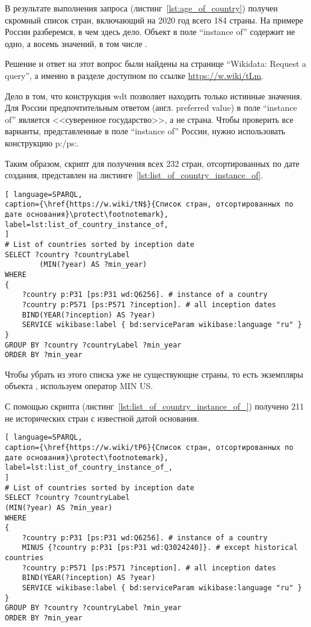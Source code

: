 В результате выполнения запроса (листинг~\ref{lst:age_of_country}) получен скромный список стран, включающий на 2020 год всего 184 страны. На примере России разберемся, в чем здесь дело. Объект  в поле ``instance of'' содержит не одно, а восемь значений, в том числе .


Решение и ответ на этот вопрос были найдены на странице ``Wikidata: Request a query'', а именно в разделе доступном по ссылке \href{https://w.wiki/tLm}{https://w.wiki/tLm}.

Дело в том, что конструкция wdt позволяет находить только истинные значения. Для России предпочтительным ответом (англ. preferred value) в поле ``instance of'' является <<суверенное государство>>, а не страна. Чтобы проверить все варианты, представленные в поле ``instance of'' России, нужно использовать конструкцию p:/ps:.

Таким образом, скрипт для получения всех 232 стран, отсортированных по дате создания, представлен на листинге~\ref{lst:list_of_country_instance_of}.

\begin{lstlisting}[ language=SPARQL, 
caption={\href{https://w.wiki/tN$}{Список стран, отсортированных по дате основания}\protect\footnotemark},
label=lst:list_of_country_instance_of, 
]
# List of countries sorted by inception date
SELECT ?country ?countryLabel
		(MIN(?year) AS ?min_year)
WHERE
{
	?country p:P31 [ps:P31 wd:Q6256]. # instance of a country 
	?country p:P571 [ps:P571 ?inception]. # all inception dates
	BIND(YEAR(?inception) AS ?year)
	SERVICE wikibase:label { bd:serviceParam wikibase:language "ru" }
}
GROUP BY ?country ?countryLabel ?min_year
ORDER BY ?min_year
\end{lstlisting}


Чтобы убрать из этого списка уже не существующие страны, то есть экземпляры объекта , используем оператор MIN US.

С помощью скрипта (листинг~\ref{lst:list_of_country_instance_of_}) получено 211 не исторических стран с известной датой основания.

\begin{lstlisting}[ language=SPARQL, 
caption={\href{https://w.wiki/tP6}{Список стран, отсортированных по дате основания}\protect\footnotemark},
label=lst:list_of_country_instance_of_, 
]
# List of countries sorted by inception date
SELECT ?country ?countryLabel 
(MIN(?year) AS ?min_year)
WHERE
{
	?country p:P31 [ps:P31 wd:Q6256]. # instance of a country 
	MINUS {?country p:P31 [ps:P31 wd:Q3024240]}. # except historical countries
	?country p:P571 [ps:P571 ?inception]. # all inception dates
	BIND(YEAR(?inception) AS ?year)
	SERVICE wikibase:label { bd:serviceParam wikibase:language "ru" }
}
GROUP BY ?country ?countryLabel ?min_year
ORDER BY ?min_year
\end{lstlisting}

